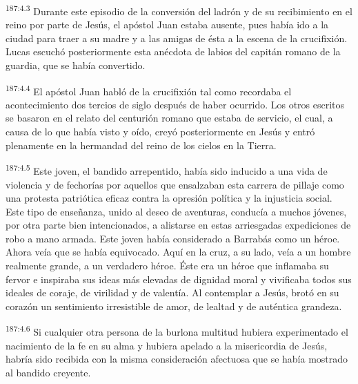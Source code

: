 \par 
\textsuperscript{187:4.3} Durante este episodio de la conversión del ladrón y de su recibimiento en el reino por parte de Jesús, el apóstol Juan estaba ausente, pues había ido a la ciudad para traer a su madre y a las amigas de ésta a la escena de la crucifixión. Lucas escuchó posteriormente esta anécdota de labios del capitán romano de la guardia, que se había convertido.

\par 
\textsuperscript{187:4.4} El apóstol Juan habló de la crucifixión tal como recordaba el acontecimiento dos tercios de siglo después de haber ocurrido. Los otros escritos se basaron en el relato del centurión romano que estaba de servicio, el cual, a causa de lo que había visto y oído, creyó posteriormente en Jesús y entró plenamente en la hermandad del reino de los cielos en la Tierra.

\par 
\textsuperscript{187:4.5} Este joven, el bandido arrepentido, había sido inducido a una vida de violencia y de fechorías por aquellos que ensalzaban esta carrera de pillaje como una protesta patriótica eficaz contra la opresión política y la injusticia social. Este tipo de enseñanza, unido al deseo de aventuras, conducía a muchos jóvenes, por otra parte bien intencionados, a alistarse en estas arriesgadas expediciones de robo a mano armada. Este joven había considerado a Barrabás como un héroe. Ahora veía que se había equivocado. Aquí en la cruz, a su lado, veía a un hombre realmente grande, a un verdadero héroe. Éste era un héroe que inflamaba su fervor e inspiraba sus ideas más elevadas de dignidad moral y vivificaba todos sus ideales de coraje, de virilidad y de valentía. Al contemplar a Jesús, brotó en su corazón un sentimiento irresistible de amor, de lealtad y de auténtica grandeza.

\par 
\textsuperscript{187:4.6} Si cualquier otra persona de la burlona multitud hubiera experimentado el nacimiento de la fe en su alma y hubiera apelado a la misericordia de Jesús, habría sido recibida con la misma consideración afectuosa que se había mostrado al bandido creyente.

